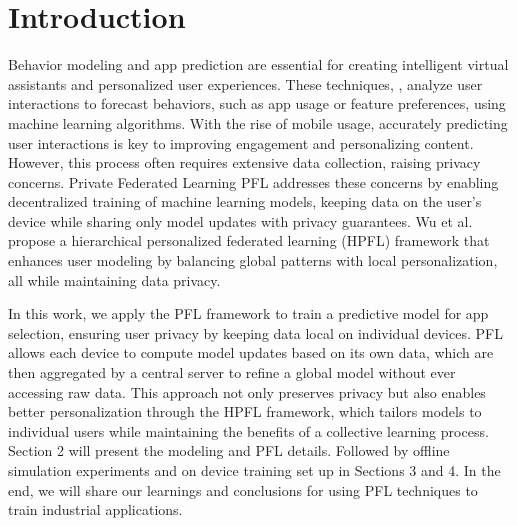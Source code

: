 
\section{Introduction}

Behavior modeling and app prediction are essential for creating intelligent virtual assistants and personalized user experiences. These techniques\cite{Tongaonkar2013UnderstandingMA}, \cite{Wang2020AHA}, \cite{Yu2017SmartphoneAU} analyze user interactions to forecast behaviors, such as app usage or feature preferences, using machine learning algorithms.
With the rise of mobile usage, accurately predicting user interactions is key to improving engagement and personalizing content. However, this process often requires extensive data collection, raising privacy concerns.
Private Federated Learning PFL \cite{Fu2024DifferentiallyPF} addresses these concerns by enabling decentralized training of machine learning models, keeping data on the user's device while sharing only model updates with privacy guarantees. Wu et al. \cite{Wu2021HierarchicalPF} propose a hierarchical personalized federated learning (HPFL) framework that enhances user modeling by balancing global patterns with local personalization, all while maintaining data privacy.


In this work, we apply the PFL framework to train a predictive model for app selection, ensuring user privacy by keeping data local on individual devices. PFL allows each device to compute model updates based on its own data, which are then aggregated by a central server to refine a global model without ever accessing raw data. This approach not only preserves privacy but also enables better personalization through the HPFL framework, which tailors models to individual users while maintaining the benefits of a collective learning process. Section 2 will present the modeling and PFL details. Followed by offline simulation experiments and on device training set up in Sections 3 and 4. In the end, we will share our learnings and conclusions for using PFL techniques to train industrial applications. 